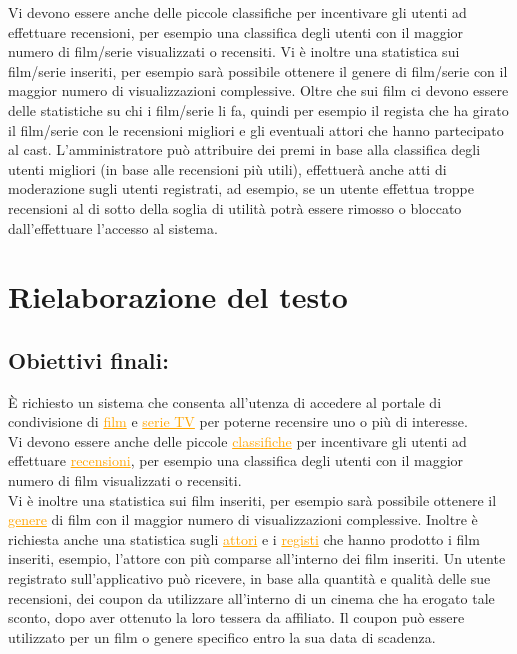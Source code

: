 \documentclass[a4paper,12pt]{report}
\begin{document}
Vi devono essere anche delle piccole classifiche per incentivare gli utenti ad effettuare recensioni, per esempio una classifica degli utenti con il maggior numero di film/serie visualizzati o recensiti. Vi è inoltre una statistica sui film/serie inseriti, per esempio sarà possibile ottenere il genere di film/serie con il maggior numero di visualizzazioni complessive. Oltre che sui film ci devono essere delle statistiche su chi i film/serie li fa, quindi per esempio il regista che ha girato il film/serie con le recensioni migliori e gli eventuali attori che hanno partecipato al cast. L'amministratore può attribuire dei premi in base alla classifica degli utenti migliori (in base alle recensioni più utili), effettuerà anche atti di moderazione sugli utenti registrati, ad esempio, se un utente effettua troppe recensioni al di sotto della soglia di utilità potrà essere rimosso o bloccato dall'effettuare l'accesso al sistema.
\section{Rielaborazione del testo}
\subsection{Obiettivi finali:}
È richiesto un sistema che consenta all'utenza di accedere al portale di condivisione di \textcolor{orange}{\underline{film}} e \textcolor{orange}{\underline{serie TV}} per poterne recensire uno o più di interesse.\\
Vi devono essere anche delle piccole \textcolor{orange}{\underline{classifiche}} per incentivare gli utenti ad effettuare \textcolor{orange}{\underline{recensioni}}, per esempio una classifica degli utenti con il maggior numero di film visualizzati o recensiti.\\
Vi è inoltre una statistica sui film inseriti, per esempio sarà possibile ottenere il \textcolor{orange}{\underline{genere}} di film con il maggior numero di visualizzazioni complessive. Inoltre è richiesta anche una statistica sugli \textcolor{orange}{\underline{attori}} e i \textcolor{orange}{\underline{registi}} che hanno prodotto i film inseriti, esempio, l'attore con più comparse all'interno dei film inseriti.
Un utente registrato sull'applicativo può ricevere, in base alla quantità e qualità delle sue recensioni, dei coupon da utilizzare all'interno di un cinema che ha erogato tale sconto, dopo aver ottenuto la loro tessera da affiliato. Il coupon può essere utilizzato per un film o genere specifico entro la sua data di scadenza.
\end{document}
